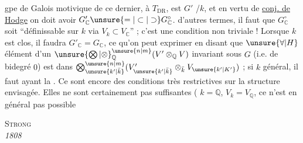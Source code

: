  gpe de Galois motivique de ce dernier,  à $T_{\mathrm{DR}}$, est    $G'$ /$k$,  et en vertu de \uline{conj. de Hodge} on doit avoir $G'_{\mathbb C}\unsure{=|\subset|\supset}G^\circ_{\mathbb C}$.   d'autres termes, il faut que $G^\circ_{\mathbb C}$ soit ``définissable sur $k$ via $V_k\subset V_{\mathbb C}$'' ; c'est une condition   non triviale ! Lorsque $k$ est  clos, il faudra  $G'_{\mathbb C}=G_{\mathbb C}$, ce qu'on peut exprimer en disant que $\unsure{\forall|H}$  élément d'un ${\unsure{\bigotimes|\otimes}}_{\mathbb Q}^{\unsure{n|m}}(V'\otimes_{\mathbb Q}V)$ invariant sous $G$ (i.e. de bidegré $0$) est  dans $\bigotimes_{\unsure{k'|\bar k}}^{\unsure{n|m}}(V'_{\unsure{k'|\bar k}}\otimes_{\bar k}V_{\unsure{k'|K'}})$\unsure{!} ; si $k$ général, il faut   ayant la  . Ce sont encore des conditions très restrictives sur la structure envisagée. Elles ne sont certainement pas suffisantes ( $k=\mathbb Q$, $V_k=V_{\mathbb Q}$, ce n'est en général pas possible
{\centering \textsc{Strong}\\
\textit{ 1808}\par}
